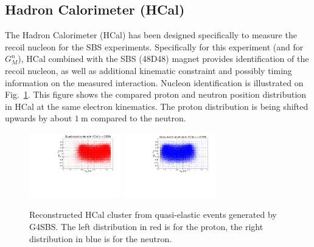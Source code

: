 \subsection{Hadron Calorimeter (HCal)}\label{sec:expsetup_hcal}

The Hadron Calorimeter (HCal) has been designed specifically to measure the recoil nucleon for the SBS experiments. Specifically for this experiment (and for $G_M^n$), HCal combined with the SBS (48D48) magnet provides identification of the recoil nucleon, as well as additional kinematic constraint and possibly timing information on the measured interaction.
Nucleon identification is illustrated on Fig.~\ref{fig:hcal_nuclimprint}. This figure shows the compared proton and neutron position distribution in HCal at the same electron kinematics. The proton distribution is being shifted upwards by about $1~\mathrm{m}$ compared to the neutron.

\begin{figure}[!h]
  \centering
    \includegraphics[angle=90,width=4cm]{Plots/HCal_p.pdf}
    \includegraphics[angle=90,width=4cm]{Plots/HCal_n.pdf}
    \caption{Reconstructed HCal cluster from quasi-elastic events generated by G4SBS. The left distribution in red is for the proton, the right distribution in blue is for the neutron.}
    \label{fig:hcal_nuclimprint}
\end{figure}

